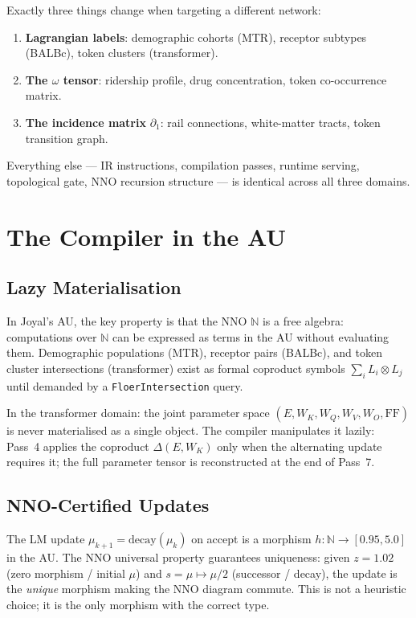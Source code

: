 \documentclass[11pt]{amsart}
\begin{document}
Exactly three things change when targeting a different network:
\begin{enumerate}
\item \textbf{Lagrangian labels}:
  demographic cohorts (MTR), receptor subtypes (BALBc),
  token clusters (transformer).
\item \textbf{The $\omega$ tensor}:
  ridership profile, drug concentration, token co-occurrence matrix.
\item \textbf{The incidence matrix} $\partial_1$:
  rail connections, white-matter tracts, token transition graph.
\end{enumerate}
Everything else --- IR instructions, compilation passes,
runtime serving, topological gate, NNO recursion structure ---
is identical across all three domains.

\section{The Compiler in the AU}

\subsection{Lazy Materialisation}

In Joyal's AU, the key property is that the NNO $\mathbb{N}$
is a free algebra: computations over $\mathbb{N}$ can be
expressed as terms in the AU without evaluating them.
Demographic populations (MTR), receptor pairs (BALBc),
and token cluster intersections (transformer) exist as
formal coproduct symbols $\sum_i L_i \otimes L_j$
until demanded by a \texttt{FloerIntersection} query.

In the transformer domain: the joint parameter space
$(E, W_K, W_Q, W_V, W_O, \text{FF})$ is never materialised as
a single object. The compiler manipulates it lazily:
Pass~4 applies the coproduct $\Delta(E, W_K)$ only when
the alternating update requires it; the full parameter
tensor is reconstructed at the end of Pass~7.

\subsection{NNO-Certified Updates}

The LM update $\mu_{k+1} = \text{decay}(\mu_k)$ on accept
is a morphism $h: \mathbb{N} \to [0.95, 5.0]$ in the AU.
The NNO universal property guarantees uniqueness: given
$z = 1.02$ (zero morphism / initial $\mu$) and
$s = \mu \mapsto \mu/2$ (successor / decay),
the update is the \emph{unique} morphism making the
NNO diagram commute.
This is not a heuristic choice; it is the only morphism
with the correct type.
\end{document}
